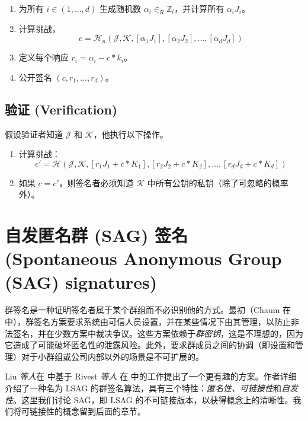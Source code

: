 \begin{enumerate}
	\item 为所有 $i \in (1,...,d)$ 生成随机数 $\alpha_i \in_R \mathbb{Z}_l$，并计算所有 $\alpha_i J_i$。
	\item 计算挑战，\vspace{.175cm}
	\[c = \mathcal{H}_n(\mathcal{J},\mathcal{K},[\alpha_1 J_1],[\alpha_2 J_2],...,[\alpha_d J_d])\]
	\item 定义每个响应 $r_i = \alpha_i - c*k_i$。
	\item 公开签名 $(c, r_1,...,r_d)$。
\end{enumerate}


\subsection*{验证 (Verification)}

假设验证者知道 $\mathcal{J}$ 和 $\mathcal{K}$，他执行以下操作。

\begin{enumerate}
	\item 计算挑战：\vspace{.175cm}
	\[c' = \mathcal{H}(\mathcal{J},\mathcal{K},[r_1 J_1 + c*K_1],[r_2 J_2 + c*K_2],...,[r_d J_d + c*K_d])\]
	\item 如果 $c = c'$，则签名者必须知道 $\mathcal{K}$ 中所有公钥的私钥（除了可忽略的概率外）。
\end{enumerate}



\section{自发匿名群 (SAG) 签名 (Spontaneous Anonymous Group (SAG) signatures)}
\label{SAG_section}

群签名是一种证明签名者属于某个群组而不必识别他的方式。最初（Chaum 在 \cite{Chaum:1991:GS:1754868.1754897} 中），群签名方案要求系统由可信人员设置，并在某些情况下由其管理，以防止非法签名，并在少数方案中裁决争议。这些方案依赖于{\em 群密钥}，这是不理想的，因为它造成了可能破坏匿名性的泄露风险。此外，要求群成员之间的协调（即设置和管理）对于小群组或公司内部以外的场景是不可扩展的。

Liu {\em 等人}在 \cite{Liu2004} 中基于 Rivest {\em 等人} 在 \cite{rivest-leak-secret} 中的工作提出了一个更有趣的方案。作者详细介绍了一种名为 LSAG 的群签名算法，具有三个特性：{\em 匿名性、可链接性}和{\em 自发性}。这里我们讨论 SAG，即 LSAG 的不可链接版本，以获得概念上的清晰性。我们将可链接性的概念留到后面的章节。

